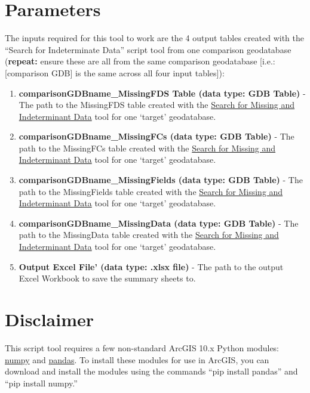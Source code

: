 \documentclass[openany]{book}
\providecommand{\tightlist}{%
  \setlength{\itemsep}{0pt}\setlength{\parskip}{0pt}}
\theoremstyle{definition}
\theoremstyle{definition}
\theoremstyle{definition}
\theoremstyle{remark}
\begin{document}
\section{Parameters}\label{parameters-9}

The inputs required for this tool to work are the 4 output tables
created with the ``Search for Indeterminate Data'' script tool from one
comparison geodatabase (\textbf{repeat:} ensure these are all from the
same comparison geodatabase {[}i.e.: {[}comparison GDB{]} is the same
across all four input tables{]}):

\begin{enumerate}
\def\labelenumi{\arabic{enumi}.}
\tightlist
\item
  \textbf{comparisonGDBname\_MissingFDS Table (data type: GDB Table)} -
  The path to the MissingFDS table created with the
  \protect\hyperlink{indtSearch}{Search for Missing and Indeterminant
  Data} tool for one `target' geodatabase.
\item
  \textbf{comparisonGDBname\_MissingFCs (data type: GDB Table)} - The
  path to the MissingFCs table created with the
  \protect\hyperlink{indtSearch}{Search for Missing and Indeterminant
  Data} tool for one `target' geodatabase.
\item
  \textbf{comparisonGDBname\_MissingFields (data type: GDB Table)} - The
  path to the MissingFields table created with the
  \protect\hyperlink{indtSearch}{Search for Missing and Indeterminant
  Data} tool for one `target' geodatabase.
\item
  \textbf{comparisonGDBname\_MissingData (data type: GDB Table)} - The
  path to the MissingData table created with the
  \protect\hyperlink{indtSearch}{Search for Missing and Indeterminant
  Data} tool for one `target' geodatabase.
\item
  \textbf{Output Excel File' (data type: .xlsx file)} - The path to the
  output Excel Workbook to save the summary sheets to.
\end{enumerate}

\section{Disclaimer}\label{disclaimer}

This script tool requires a few non-standard ArcGIS 10.x Python modules:
\href{http://www.numpy.org/}{numpy} and
\href{https://pandas.pydata.org/}{pandas}. To install these modules for
use in ArcGIS, you can download and install the modules using the
commands ``pip install pandas'' and ``pip install numpy.''
\end{document}
